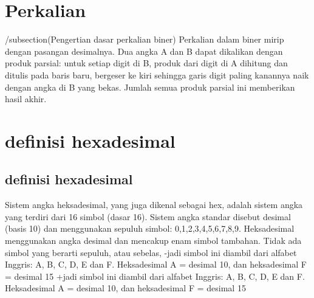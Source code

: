\section{Perkalian}
 
 /subsection(Pengertian dasar perkalian biner)
  Perkalian dalam biner mirip dengan pasangan desimalnya. Dua angka A dan B dapat dikalikan dengan produk parsial: 
  untuk setiap digit di B, produk dari digit di A dihitung dan ditulis pada baris baru, bergeser ke kiri sehingga 
  garis digit paling kanannya naik dengan angka di B yang bekas. Jumlah semua produk parsial ini memberikan hasil akhir.
  
 \section{definisi hexadesimal}
 \subsection{definisi hexadesimal}
  Sistem angka heksadesimal, yang juga dikenal sebagai hex, adalah sistem angka yang terdiri dari 16 simbol (dasar 16). 
  Sistem angka standar disebut desimal (basis 10) dan menggunakan sepuluh simbol: 0,1,2,3,4,5,6,7,8,9. Heksadesimal 
  menggunakan angka desimal dan mencakup enam simbol tambahan. Tidak ada simbol yang berarti sepuluh, atau sebelas, 
 -jadi simbol ini diambil dari alfabet Inggris: A, B, C, D, E dan F. Heksadesimal A = desimal 10, dan heksadesimal F = desimal 15
 +jadi simbol ini diambil dari alfabet Inggris: A, B, C, D, E dan F. Heksadesimal A = desimal 10, dan heksadesimal F = desimal 15
 
